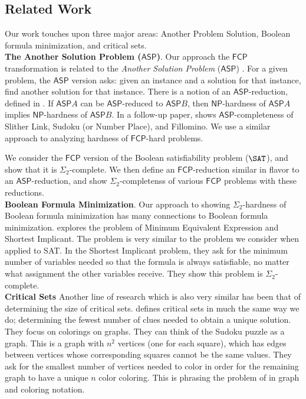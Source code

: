 \documentclass[runningheads,a4paper]{llncs}
\begin{document}
\subsection{Related Work}
\label{sec:relatedwork}

Our work touches upon three major areas: Another Problem Solution, Boolean formula minimization, and critical sets. \\

\noindent\textbf{The Another Solution Problem ($\mathsf{ASP}$)}. Our approach the $\mathsf{FCP}$ transformation is related to the \emph{Another Solution Problem} ($\mathsf{ASP}$) \cite{Seta01}. For a given problem, the $\mathsf{ASP}$ version asks: given an instance and a solution for that instance, find another solution for that instance. There is a notion of an $\mathsf{ASP}$-reduction, defined in \cite{Seta01}. If $\mathsf{ASP} A$ can be $\mathsf{ASP}$-reduced to $\mathsf{ASP} B$, then $\mathsf{NP}$-hardness of $\mathsf{ASP} A$ implies $\mathsf{NP}$-hardness of $\mathsf{ASP} B$. In a follow-up paper, \cite{takayuki2003complexity} shows $\mathsf{ASP}$-completeness of Slither Link, Sudoku (or Number Place), and Fillomino. We use a similar approach to analyzing hardness of $\mathsf{FCP}$-hard problems. 

We consider the $\mathsf{FCP}$ version of the Boolean satisfiability problem ($\SAT$), and show that it is $\Sigma_2$-complete. We then define an $\mathsf{FCP}$-reduction similar in flavor to an $\mathsf{ASP}$-reduction, and show $\Sigma_2$-completenss of various $\mathsf{FCP}$ problems with these reductions.\\

\noindent\textbf{Boolean Formula Minimization}. Our approach to showing $\Sigma_2$-hardness of Boolean formula minimization has many connections to Boolean formula minimization. \cite{umans}\cite{umans2001minimum} explores the problem of Minimum Equivalent Expression and Shortest Implicant. The problem is very similar to the problem we consider when applied to SAT. In the Shortest Implicant problem, they ask for the minimum number of variables needed so that the formula is always satisfiable, no matter what assignment the other variables receive. They show this problem is $\Sigma_2$-complete.  \\

\noindent\textbf{Critical Sets} Another line of research which is also very similar has been that of determining the size of critical sets. \cite{Cooper:2014:CSS:2612293.2612628} defines critical sets in much the same way we do; determining the fewest number of clues needed to obtain a unique solution. They focus on colorings on graphs. They can think of the Sudoku puzzle as a graph. This is a graph with $n^2$ vertices (one for each square), which has edges between vertices whose corresponding squares cannot be the same values. They ask for the smallest number of vertices needed to color in order for the remaining graph to have a unique $n$ color coloring. This is phrasing the problem of \cite{mcguire2012there} in graph and coloring notation. 
\end{document}
